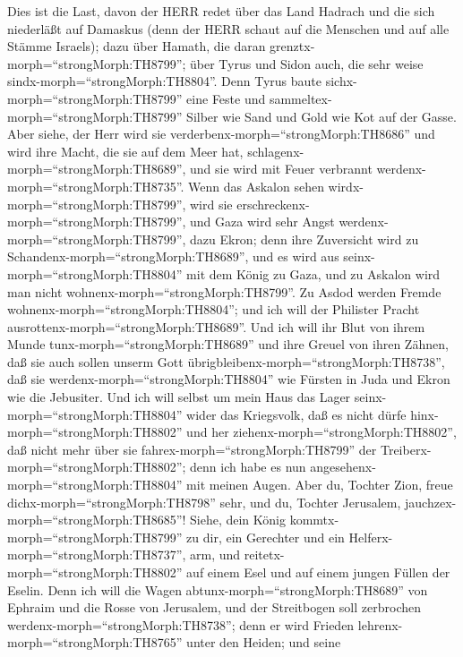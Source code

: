  Dies ist die Last, davon der HERR redet über das Land
Hadrach und die sich niederläßt auf Damaskus (denn der HERR schaut auf
die Menschen und auf alle Stämme Israels);  dazu über
Hamath, die daran grenztx-morph=``strongMorph:TH8799''; über Tyrus und
Sidon auch, die sehr weise sindx-morph=``strongMorph:TH8804''.
 Denn Tyrus baute sichx-morph=``strongMorph:TH8799'' eine
Feste und sammeltex-morph=``strongMorph:TH8799'' Silber wie Sand und
Gold wie Kot auf der Gasse.  Aber siehe, der Herr wird sie
verderbenx-morph=``strongMorph:TH8686'' und wird ihre Macht, die sie auf
dem Meer hat, schlagenx-morph=``strongMorph:TH8689'', und sie wird mit
Feuer verbrannt werdenx-morph=``strongMorph:TH8735''.  Wenn
das Askalon sehen wirdx-morph=``strongMorph:TH8799'', wird sie
erschreckenx-morph=``strongMorph:TH8799'', und Gaza wird sehr Angst
werdenx-morph=``strongMorph:TH8799'', dazu Ekron; denn ihre Zuversicht
wird zu Schandenx-morph=``strongMorph:TH8689'', und es wird aus
seinx-morph=``strongMorph:TH8804'' mit dem König zu Gaza, und zu Askalon
wird man nicht wohnenx-morph=``strongMorph:TH8799''.  Zu
Asdod werden Fremde wohnenx-morph=``strongMorph:TH8804''; und ich will
der Philister Pracht ausrottenx-morph=``strongMorph:TH8689''.
 Und ich will ihr Blut von ihrem Munde
tunx-morph=``strongMorph:TH8689'' und ihre Greuel von ihren Zähnen, daß
sie auch sollen unserm Gott übrigbleibenx-morph=``strongMorph:TH8738'',
daß sie werdenx-morph=``strongMorph:TH8804'' wie Fürsten in Juda und
Ekron wie die Jebusiter.  Und ich will selbst um mein Haus
das Lager seinx-morph=``strongMorph:TH8804'' wider das Kriegsvolk, daß
es nicht dürfe hinx-morph=``strongMorph:TH8802'' und her
ziehenx-morph=``strongMorph:TH8802'', daß nicht mehr über sie
fahrex-morph=``strongMorph:TH8799'' der
Treiberx-morph=``strongMorph:TH8802''; denn ich habe es nun
angesehenx-morph=``strongMorph:TH8804'' mit meinen Augen. 
Aber du, Tochter Zion, freue dichx-morph=``strongMorph:TH8798'' sehr,
und du, Tochter Jerusalem, jauchzex-morph=``strongMorph:TH8685''! Siehe,
dein König kommtx-morph=``strongMorph:TH8799'' zu dir, ein Gerechter und
ein Helferx-morph=``strongMorph:TH8737'', arm, und
reitetx-morph=``strongMorph:TH8802'' auf einem Esel und auf einem jungen
Füllen der Eselin.  Denn ich will die Wagen
abtunx-morph=``strongMorph:TH8689'' von Ephraim und die Rosse von
Jerusalem, und der Streitbogen soll zerbrochen
werdenx-morph=``strongMorph:TH8738''; denn er wird Frieden
lehrenx-morph=``strongMorph:TH8765'' unter den Heiden; und seine

